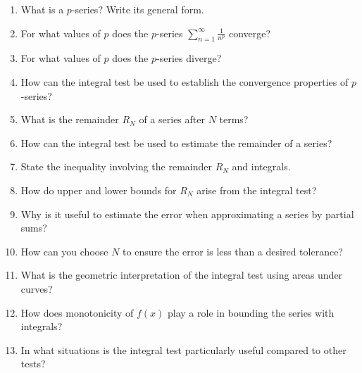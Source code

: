 \begin{enumerate}
  \item What is a \(p\)-series? Write its general form.
  \item For what values of \(p\) does the \(p\)-series \(\sum_{n=1}^{\infty}\frac{1}{n^{p}}\) converge?
  \item For what values of \(p\) does the \(p\)-series diverge?
  \item How can the integral test be used to establish the convergence properties of \(p\)-series?
  \item What is the remainder \(R_{N}\) of a series after \(N\) terms?
  \item How can the integral test be used to estimate the remainder of a series?
  \item State the inequality involving the remainder \(R_{N}\) and integrals.
  \item How do upper and lower bounds for \(R_{N}\) arise from the integral test?
  \item Why is it useful to estimate the error when approximating a series by partial sums?
  \item How can you choose \(N\) to ensure the error is less than a desired tolerance?
  \item What is the geometric interpretation of the integral test using areas under curves?
  \item How does monotonicity of \(f(x)\) play a role in bounding the series with integrals?
  \item In what situations is the integral test particularly useful compared to other tests?
\end{enumerate}
